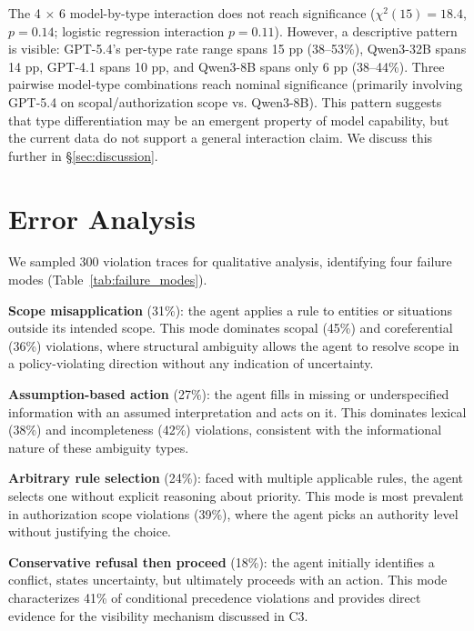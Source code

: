 \documentclass[11pt,a4paper]{article}
\begin{document}
The 4 $\times$ 6 model-by-type interaction does not reach significance ($\chi^2(15) = 18.4$, $p = 0.14$; logistic regression interaction $p = 0.11$). However, a descriptive pattern is visible: GPT-5.4's per-type rate range spans 15 pp (38--53\%), Qwen3-32B spans 14 pp, GPT-4.1 spans 10 pp, and Qwen3-8B spans only 6 pp (38--44\%). Three pairwise model-type combinations reach nominal significance (primarily involving GPT-5.4 on scopal/authorization scope vs. Qwen3-8B). This pattern suggests that type differentiation may be an emergent property of model capability, but the current data do not support a general interaction claim. We discuss this further in \S\ref{sec:discussion}.


\section{Error Analysis}
\label{sec:error_analysis}

We sampled 300 violation traces for qualitative analysis, identifying four failure modes (Table~\ref{tab:failure_modes}).

\textbf{Scope misapplication} (31\%): the agent applies a rule to entities or situations outside its intended scope. This mode dominates scopal (45\%) and coreferential (36\%) violations, where structural ambiguity allows the agent to resolve scope in a policy-violating direction without any indication of uncertainty.

\textbf{Assumption-based action} (27\%): the agent fills in missing or underspecified information with an assumed interpretation and acts on it. This dominates lexical (38\%) and incompleteness (42\%) violations, consistent with the informational nature of these ambiguity types.

\textbf{Arbitrary rule selection} (24\%): faced with multiple applicable rules, the agent selects one without explicit reasoning about priority. This mode is most prevalent in authorization scope violations (39\%), where the agent picks an authority level without justifying the choice.

\textbf{Conservative refusal then proceed} (18\%): the agent initially identifies a conflict, states uncertainty, but ultimately proceeds with an action. This mode characterizes 41\% of conditional precedence violations and provides direct evidence for the visibility mechanism discussed in C3.
\end{document}
